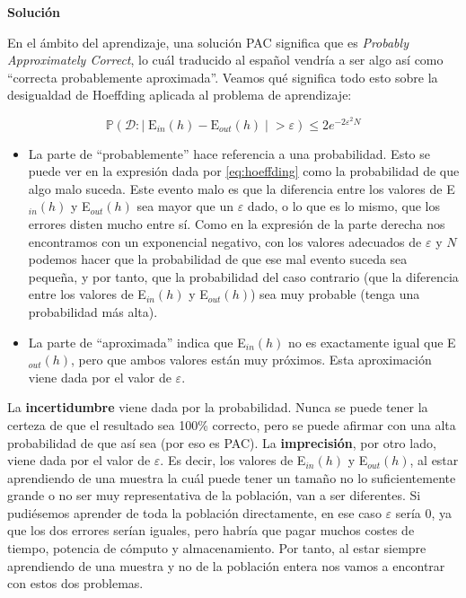 \documentclass[11pt,a4paper]{article}
\newcommand{\answer}{\noindent\textbf{Solución}}
\newcommand{\ein}{E$_{in}$}
\newcommand{\eout}{E$_{out}$}
\begin{document}
\answer

En el ámbito del aprendizaje, una solución PAC significa que es \textit{Probably Approximately Correct}, 
lo cuál traducido al español vendría a ser algo así como ``correcta probablemente aproximada''.
Veamos qué significa todo esto sobre la desigualdad de Hoeffding aplicada al problema de aprendizaje:

\begin{equation}
\label{eq:hoeffding}
	\mathbb{P}(\mathcal{D}: | \; \text{E}_{in}(h) - \text{E}_{out}(h) \; | \; > \varepsilon) \leq 2e^{-2\varepsilon^2N}
\end{equation}

\begin{itemize}[label=\textbullet]
	\item  La parte de ``probablemente'' hace referencia a una probabilidad. Esto se puede ver en la expresión dada
	por \eqref{eq:hoeffding} como la probabilidad de que algo malo suceda. Este evento malo es que la
	diferencia 	entre los valores de \ein{}$(h)$ y \eout{}$(h)$ sea mayor que un $\varepsilon$ dado, o lo que es lo mismo,
	que los errores disten mucho entre sí. Como en la 	expresión de la parte derecha nos encontramos con un exponencial
	negativo, con los valores adecuados de $\varepsilon$ y $N$ podemos hacer que la probabilidad de que ese mal evento
	suceda sea pequeña, y por tanto, que la probabilidad del caso contrario (que la diferencia entre los valores 
	de \ein{}$(h)$ y \eout{}$(h)$) sea muy probable (tenga una probabilidad más alta).
	\item La parte de ``aproximada'' indica que \ein{}$(h)$ no es exactamente igual que \eout{}$(h)$,
	pero que ambos valores están muy próximos. Esta aproximación viene dada por el valor de $\varepsilon$.
\end{itemize}

La \textbf{incertidumbre} viene dada por la probabilidad. Nunca se puede tener la certeza de que el resultado sea 100\%
correcto, pero se puede afirmar con una alta probabilidad de que así sea (por eso es PAC).
La \textbf{imprecisión}, por otro lado, viene dada por el valor de $\varepsilon$. Es decir, los valores de \ein{}$(h)$ y
\eout{}$(h)$, al estar aprendiendo de una muestra la cuál puede tener un tamaño no lo suficientemente grande o no ser muy
representativa de la población, van a ser diferentes.
Si pudiésemos aprender de toda la población directamente, en ese caso $\varepsilon$ sería 0, ya que los dos errores serían
iguales, pero habría que pagar muchos costes de tiempo, potencia de cómputo y almacenamiento. Por tanto, al estar siempre
aprendiendo de una muestra y no de la población entera nos vamos a encontrar con estos dos problemas.
\end{document}
